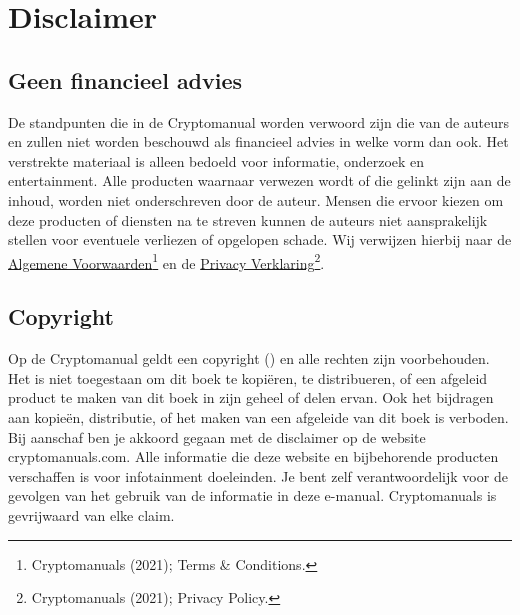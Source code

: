 \chapter*{Disclaimer}

\section*{Geen financieel advies}
De standpunten die in de Cryptomanual worden verwoord zijn die van de auteurs en zullen niet worden beschouwd als financieel advies in welke vorm dan ook.
Het verstrekte materiaal is alleen bedoeld voor informatie, onderzoek en entertainment. Alle producten waarnaar verwezen wordt of die gelinkt zijn aan de inhoud, worden niet onderschreven door de auteur. Mensen die ervoor kiezen om deze producten of diensten na te streven kunnen de auteurs niet aansprakelijk stellen voor eventuele verliezen of opgelopen schade. Wij verwijzen hierbij naar de \href{https://cryptomanuals.com/terms-conditions/}{Algemene Voorwaarden\footnote{Cryptomanuals\textsuperscript{\textcopyright}  (2021); \href{https://cryptomanuals.com/terms-conditions/}{Terms \& Conditions}.}} en de \href{https://cryptomanuals.com/privacy-policy}{Privacy Verklaring\footnote{Cryptomanuals\textsuperscript{\textcopyright} (2021); \href{https://cryptomanuals.com/privacy-policy}{Privacy Policy}.}}.

\section*{Copyright}
Op de Cryptomanual geldt een copyright (\textcopyright) en alle rechten zijn voorbehouden. Het is niet toegestaan om dit boek te kopi{\"e}ren, te distribueren, of een afgeleid product te maken van dit boek in zijn geheel of delen ervan. Ook het bijdragen aan kopie{\"e}n, distributie, of het maken van een afgeleide van dit boek is verboden. Bij aanschaf ben je akkoord gegaan met de disclaimer op de website cryptomanuals.com. Alle informatie die deze website en bijbehorende producten verschaffen is voor infotainment doeleinden. Je bent zelf verantwoordelijk voor de gevolgen van het gebruik van de informatie in deze e-manual. Cryptomanuals is gevrijwaard van elke claim.


